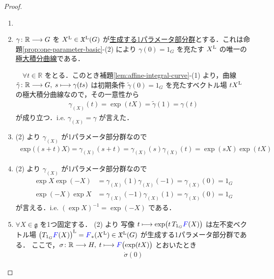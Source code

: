\documentclass[TQFT_main]{subfiles}
\begin{document}
\begin{proof}
    \begin{enumerate}
        \item ~\cite[p.519, Proposition 20.8-(1)]{Lee2012smooth}
        \item $\gamma \colon \mathbb{R} \longrightarrow G$ を $X^{\mathrm{L}} \in \mathfrak{X}^{\mathrm{L}}(G)$ が\hyperref[prop:one-parameter-basic]{生成する1パラメータ部分群}とする．これは命題\ref{prop:one-parameter-basic}-(2) により $\gamma(0) = 1_G$ を充たす $X^{\mathrm{L}}$ の唯一の\hyperref[thm:fundamental-flow]{極大積分曲線}である．
        
        　$\forall t \in \mathbb{R}$ をとる．このとき補題\ref{lem:affine-integral-curve}-(1) より，\cinfty 曲線 $\tilde{\gamma} \colon \mathbb{R} \longrightarrow G,\; s \longmapsto \gamma(ts)$ は初期条件 $\tilde{\gamma}(0) = 1_G$ を充たすベクトル場 $t X^{\mathrm{L}}$ の極大積分曲線なので，その一意性から
        \begin{align}
            \gamma_{(X)}(t) = \exp (tX) = \tilde{\gamma}(1) = \gamma(t)
        \end{align}
        が成り立つ．i.e. $\gamma_{(X)} = \gamma$ が言えた．
        \item (2) より $\gamma_{(X)}$ が1パラメータ部分群なので
        \begin{align}
            \exp \bigl( (s+t)X \bigr) = \gamma_{(X)}(s+t) = \gamma_{(X)}(s)\gamma_{(X)}(t) = \exp(sX)\exp(tX)
        \end{align}
        \item (2) より $\gamma_{(X)}$ が1パラメータ部分群なので
        \begin{align}
            \exp X \exp(-X) &= \gamma_{(X)} (1) \gamma_{(X)}(-1) = \gamma_{(X)}(0) = 1_G \\
            \exp (-X) \exp X &= \gamma_{(X)} (-1) \gamma_{(X)}(1) = \gamma_{(X)}(0) = 1_G
        \end{align}
        が言える．i.e. $(\exp X)^{-1} = \exp (-X)$ である．
        \item $\forall X \in \mathfrak{g}$ を1つ固定する．
        (2) より \cinfty 写像 $t \longmapsto \exp \bigl(t\, T_{1_G} \textcolor{blue}{F}(X)\bigr)$ は左不変ベクトル場 $\bigl(T_{1_G} \textcolor{blue}{F}(X)\bigr)^{\mathrm{L}} = \textcolor{blue}{F}_*(X^{\mathrm{L}}) \in \mathfrak{X}^{\mathrm{L}}(G)$ が生成する1パラメータ部分群である．
        ここで，$\sigma \colon \mathbb{R} \longrightarrow H,\; t \longmapsto \textcolor{blue}{F}\bigl(\exp (tX)\bigr)$ とおいたとき
        \begin{align}
            \dot{\sigma}(0)

\end{align}
\end{enumerate}
\end{proof}
\end{document}
